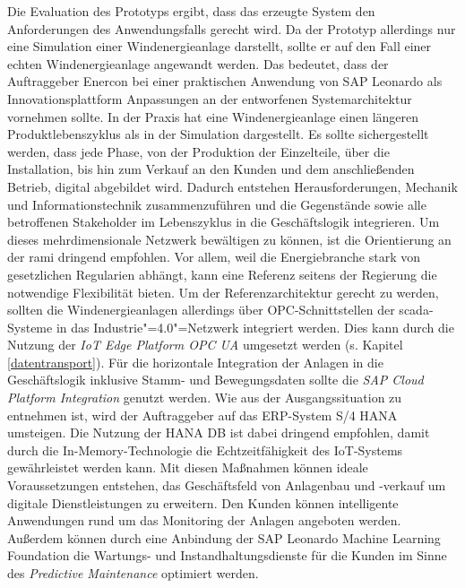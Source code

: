 Die Evaluation des Prototyps ergibt, dass das erzeugte System den Anforderungen des Anwendungsfalls gerecht wird. Da der Prototyp allerdings nur eine Simulation einer Windenergieanlage darstellt, sollte er auf den Fall einer echten Windenergieanlage angewandt werden. Das bedeutet, dass der Auftraggeber Enercon bei einer praktischen Anwendung von SAP Leonardo als Innovationsplattform Anpassungen an der entworfenen Systemarchitektur vornehmen sollte. In der Praxis hat eine Windenergieanlage einen längeren Produktlebenszyklus als in der Simulation dargestellt. Es sollte sichergestellt werden, dass jede Phase, von der Produktion der Einzelteile, über die Installation, bis hin zum Verkauf an den Kunden und dem anschließenden Betrieb, digital abgebildet wird. Dadurch entstehen Herausforderungen, Mechanik und Informationstechnik zusammenzuführen und die Gegenstände sowie alle betroffenen Stakeholder im Lebenszyklus in die Geschäftslogik integrieren. Um dieses mehrdimensionale Netzwerk bewältigen zu können, ist die Orientierung an der \ac{rami} dringend empfohlen. Vor allem, weil die Energiebranche stark von gesetzlichen Regularien abhängt, kann eine Referenz seitens der Regierung die notwendige Flexibilität bieten. Um der Referenzarchitektur gerecht zu werden, sollten die Windenergieanlagen allerdings über OPC-Schnittstellen der \ac{scada}-Systeme in das Industrie"=4.0"=Netzwerk integriert werden. Dies kann durch die Nutzung der \textit{IoT Edge Platform OPC UA} umgesetzt werden (s. Kapitel \ref{datentransport}). Für die horizontale Integration der Anlagen in die Geschäftslogik inklusive Stamm- und Bewegungsdaten sollte die \textit{SAP Cloud Platform Integration} genutzt werden. Wie aus der Ausgangssituation zu entnehmen ist, wird der Auftraggeber auf das ERP-System S/4 HANA umsteigen. Die Nutzung der HANA DB ist dabei dringend empfohlen, damit durch die In-Memory-Technologie die Echtzeitfähigkeit des IoT-Systems gewährleistet werden kann. Mit diesen Maßnahmen können ideale Voraussetzungen entstehen, das Geschäftsfeld von Anlagenbau und -verkauf um digitale Dienstleistungen zu erweitern. Den Kunden können intelligente Anwendungen rund um das Monitoring der Anlagen angeboten werden. Außerdem können durch eine Anbindung der SAP Leonardo Machine Learning Foundation die Wartungs- und Instandhaltungsdienste für die Kunden im Sinne des \textit{Predictive Maintenance} optimiert werden. 
 

\newpage
